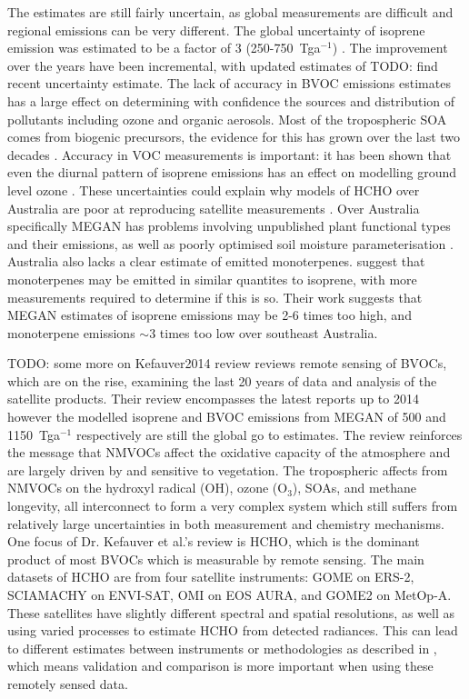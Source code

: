     The estimates are still fairly uncertain, as global measurements are difficult and regional emissions can be very different. 
    The global uncertainty of isoprene emission was estimated to be a factor of 3 (250-750~Tga$^{-1}$) \citep{Kanakidou2005}.
    The improvement over the years have been incremental, with updated estimates of TODO: find recent uncertainty estimate.
    The lack of accuracy in BVOC emissions estimates has a large effect on determining with confidence the sources and distribution of pollutants including ozone and organic aerosols.
    Most of the tropospheric SOA comes from biogenic precursors, the evidence for this has grown over the last two decades \citep{Guenther1995, Kanakidou2005,Guenther2012}.
    Accuracy in VOC measurements is important: it has been shown that even the diurnal pattern of isoprene emissions has an effect on modelling ground level ozone \citep{Hewitt2011,Fan2004}.
    These uncertainties could explain why models of HCHO over Australia are poor at reproducing satellite measurements \citep{Stavrakou2009}.
    Over Australia specifically MEGAN has problems involving unpublished plant functional types and their emissions, as well as poorly optimised soil moisture parameterisation \citep{Emmerson2016}.
    Australia also lacks a clear estimate of emitted monoterpenes.
    \cite{Emmerson2016} suggest that monoterpenes may be emitted in similar quantites to isoprene, with more measurements required to determine if this is so.
    Their work suggests that MEGAN estimates of isoprene emissions may be 2-6 times too high, and monoterpene emissions $\sim3$ times too low over southeast Australia.
    
    TODO: some more on Kefauver2014 review 
    \cite{Kefauver2014} reviews remote sensing of BVOCs, which are on the rise, examining the last 20 years of data and analysis of the satellite products.
    Their review encompasses the latest reports up to 2014 however the modelled isoprene and BVOC emissions from MEGAN \citep{Guenther2000} of 500 and 1150~Tga$^{-1}$ respectively are still the global go to estimates.
    The review reinforces the message that NMVOCs affect the oxidative capacity of the atmosphere and are largely driven by and sensitive to vegetation.
    The tropospheric affects from NMVOCs on the hydroxyl radical (OH), ozone (O$_3$), SOAs, and methane longevity, all interconnect to form a very complex system which still suffers from relatively large uncertainties in both measurement and chemistry mechanisms.
    One focus of Dr. Kefauver et al.'s review is HCHO, which is the dominant product of most BVOCs which is measurable by remote sensing.
    The main datasets of HCHO are from four satellite instruments: GOME on ERS-2, SCIAMACHY on ENVI-SAT, OMI on EOS AURA, and GOME2 on MetOp-A.
    These satellites have slightly different spectral and spatial resolutions, as well as using varied processes to estimate HCHO from detected radiances.
    This can lead to different estimates between instruments or methodologies as described in \cite{Lorent2017}, which means validation and comparison is more important when using these remotely sensed data.
    

